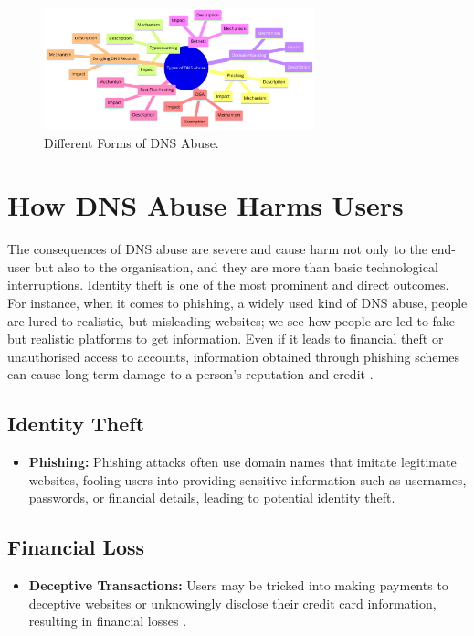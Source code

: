 \captionsetup{font= footnotesize}
\begin{figure}[H]
\centering
\includegraphics[width=0.7\textwidth]{background/dnsformstypes.png}
\caption{Different Forms of DNS Abuse.}
\label{fig:figureThree}
\end{figure}




\section{How DNS Abuse Harms Users}

The consequences of DNS abuse are severe and cause harm not only to the end-user but also to the organisation, and they are more than basic technological interruptions. Identity theft is one of the most prominent and direct outcomes. For instance, when it comes to phishing, a widely used kind of DNS abuse, people are lured to realistic, but misleading websites; we see how people are led to fake but realistic platforms to get information. Even if it leads to financial theft or unauthorised access to accounts, information obtained through phishing schemes can cause long-term damage to a person's reputation and credit \cite{godaddy2023dnsabuse}.

\subsection{Identity Theft}
\begin{itemize}
    \item \textbf{Phishing:} Phishing attacks often use domain names that imitate legitimate websites, fooling users into providing sensitive information such as usernames, passwords, or financial details, leading to potential identity theft.
\end{itemize}

\subsection{Financial Loss}
\begin{itemize}
    \item \textbf{Deceptive Transactions:} Users may be tricked into making payments to deceptive websites or unknowingly disclose their credit card information, resulting in financial losses \cite{bohme2013economics}.
\end{itemize}

